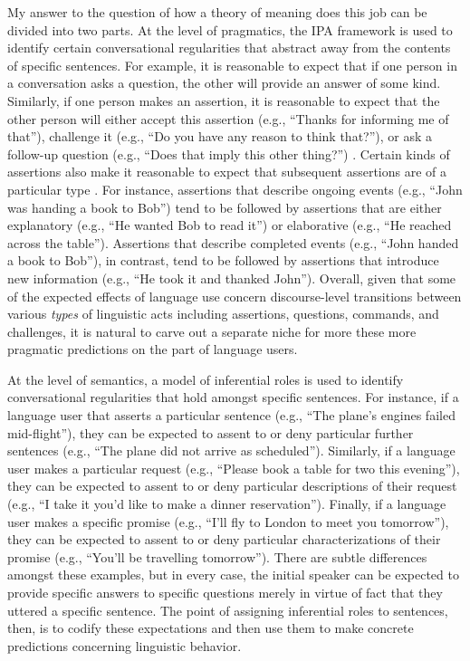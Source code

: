 My answer to the question of how a theory of meaning does this job can be divided into two parts. At the level of pragmatics, the IPA framework is used to identify certain conversational regularities that abstract away from the contents of specific sentences. For example, it is reasonable to expect that if one person in a conversation asks a question, the other will provide an answer of some kind. Similarly, if one person makes an assertion, it is reasonable to expect that the other person will either accept this assertion (e.g., ``Thanks for informing me of that''), challenge it (e.g., ``Do you have any reason to think that?''), or ask a follow-up question (e.g., ``Does that imply this other thing?'') \citep{Brandom:1994}. Certain kinds of assertions also make it reasonable to expect that subsequent assertions are of a particular type \citep{Rohde:2008}. For instance, assertions that describe ongoing events (e.g., ``John was handing a book to Bob'') tend to be followed by assertions that are either explanatory (e.g., ``He wanted Bob to read it'') or elaborative (e.g., ``He reached across the table''). Assertions that describe completed events (e.g., ``John handed a book to Bob''), in contrast, tend to be followed by assertions that introduce new information (e.g., ``He took it and thanked John''). Overall, given that some of the expected effects of language use concern discourse-level transitions between various \textit{types} of linguistic acts including assertions, questions, commands, and challenges, it is natural to carve out a separate niche for more these more pragmatic predictions on the part of language users. 

At the level of semantics, a model of inferential roles is used to identify conversational regularities that hold amongst specific sentences. For instance, if a language user that asserts a particular sentence (e.g., ``The plane's engines failed mid-flight''), they can be expected to assent to or deny particular further sentences (e.g., ``The plane did not arrive as scheduled''). Similarly, if a language user makes a particular request (e.g., ``Please book a table for two this evening''), they can be expected to assent to or deny particular descriptions of their request (e.g., ``I take it you'd like to make a dinner reservation''). Finally, if a language user makes a specific promise (e.g., ``I'll fly to London to meet you tomorrow''), they can be expected to assent to or deny particular characterizations of their promise (e.g., ``You'll be travelling tomorrow''). There are subtle differences amongst these examples, but in every case, the initial speaker can be expected to provide specific answers to specific questions merely in virtue of fact that they uttered a specific sentence. The point of assigning inferential roles to sentences, then, is to codify these expectations and then use them to make concrete predictions concerning linguistic behavior. 

